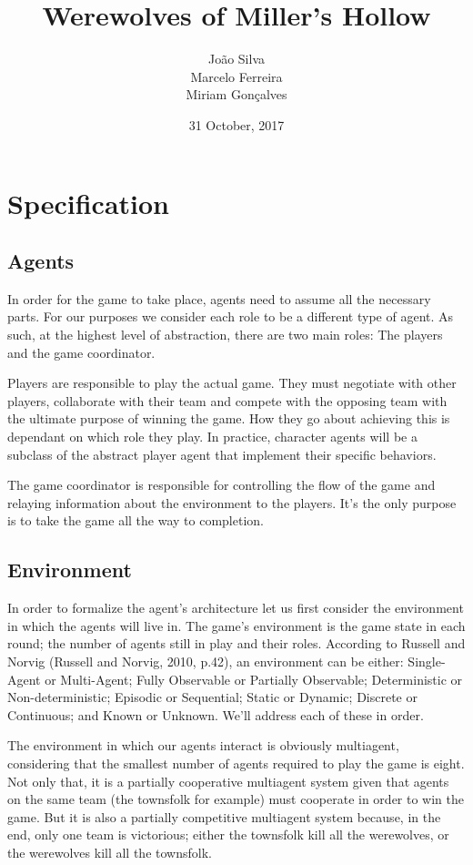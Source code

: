 \documentclass{article}
\title{\textbf{Werewolves of Miller's Hollow}}
\author{João Silva\\
		Marcelo Ferreira\\
		Miriam Gonçalves}
\date{31 October, 2017}
\begin{document}
\maketitle

\section{Specification}

\subsection{Agents}
In order for the game to take place, agents need to assume all the necessary parts. For our purposes we consider each role to be a different type of agent. As such, at the highest level of abstraction, there are two main roles: The players and the game coordinator.

Players are responsible to play the actual game. They must negotiate with other players, collaborate with their team and compete with the opposing team with the ultimate purpose of winning the game. How they go about achieving this is dependant on which role they play. In practice, character agents will be a subclass of the abstract player agent that implement their specific behaviors.

The game coordinator is responsible for controlling the flow of the game and relaying information about the environment to the players. It's the only purpose is to take the game all the way to completion.

\subsection{Environment}
In order to formalize the agent's architecture let us first consider the environment in which the agents will live in. The game's environment is the game state in each round; the number of agents still in play and their roles. According to Russell and Norvig (Russell and Norvig, 2010, p.42), an environment can be either: Single-Agent or Multi-Agent; Fully Observable or Partially Observable; Deterministic or Non-deterministic; Episodic or Sequential; Static or Dynamic; Discrete or Continuous; and Known or Unknown. We'll address each of these in order.

The environment in which our agents interact is obviously multiagent, considering that the smallest number of agents required to play the game is eight. Not only that, it is a partially cooperative multiagent system given that agents on the same team (the townsfolk for example) must cooperate in order to win the game. But it is also a partially competitive multiagent system because, in the end, only one team is victorious; either the townsfolk kill all the werewolves, or the werewolves kill all the townsfolk.
\end{document}
